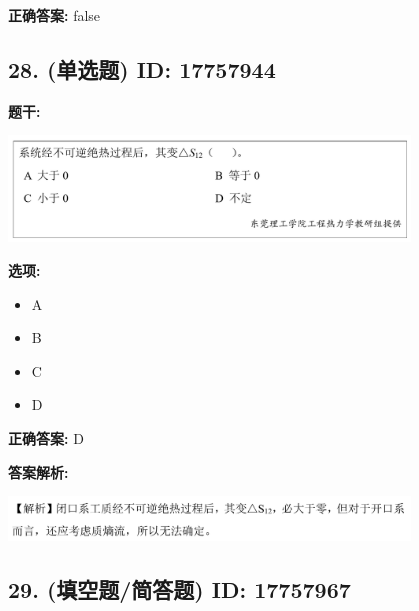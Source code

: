 \documentclass[12pt]{article}
\begin{document}
\textbf{正确答案:}
false

\vspace{0.5em}\hrulefill\vspace{1em}

\subsection*{28. (单选题) \small ID: 17757944}

\textbf{题干:}


\begin{center}\includegraphics[width=0.8\textwidth, height=0.25\textheight, keepaspectratio]{question_28_17757944/title_img_1.png}\end{center}

\textbf{选项:}
\begin{itemize}[leftmargin=*]
  \item A

  \item B

  \item C

  \item D

\end{itemize}

\textbf{正确答案:}
D

\textbf{答案解析:}


\begin{center}\includegraphics[width=0.8\textwidth, height=0.25\textheight, keepaspectratio]{question_28_17757944/correct_replay_img_1.png}\end{center}

\vspace{0.5em}\hrulefill\vspace{1em}

\subsection*{29. (填空题/简答题) \small ID: 17757967}
\end{document}
